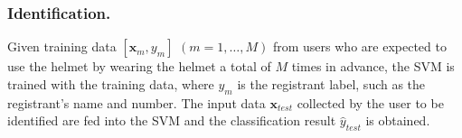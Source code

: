 \documentclass[sigchi,authordraft]{acmart}
\begin{document}

\subsubsection{Identification.}
Given training data $[\bm{x}_m,y_m]$ $(m=1,\dots, M)$ from users who are expected to use the helmet by wearing the helmet a total of $M$ times in advance, the SVM is trained with the training data, where $y_m$ is the registrant label, such as the registrant's name and number. The input data $\bm{x}_{test}$ collected by the user to be identified are fed into the SVM and the classification result $\hat{y}_{test}$ is obtained.



\end{document}
